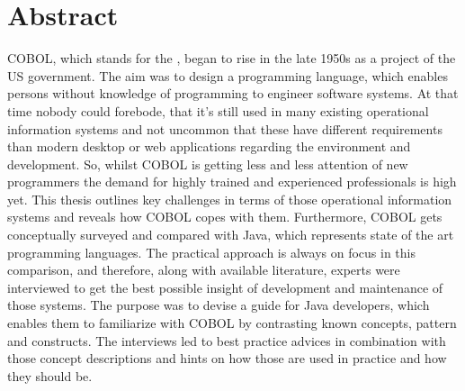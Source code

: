 \chapter*{Abstract} 

COBOL, which stands for the , began to rise in the late 1950s as a project of the US government. The aim was to design a programming language, which enables persons without knowledge of programming to engineer software systems. At that time nobody could forebode, that it's still used in many existing operational information systems and not uncommon that these have different requirements than modern desktop or web applications regarding the environment and development. So, whilst COBOL is getting less and less attention of new programmers the demand for highly trained and experienced professionals is high yet. This thesis outlines key challenges in terms of those operational information systems and reveals how COBOL copes with them. Furthermore, COBOL gets conceptually surveyed and compared with Java, which represents state of the art programming languages. The practical approach is always on focus in this comparison, and therefore, along with available literature, experts were interviewed to get the best possible insight of development and maintenance of those systems. The purpose was to devise a guide for Java developers, which enables them to familiarize with COBOL by contrasting known concepts, pattern and constructs. The interviews led to best practice advices in combination with those concept descriptions and hints on how those are used in practice and how they should be.